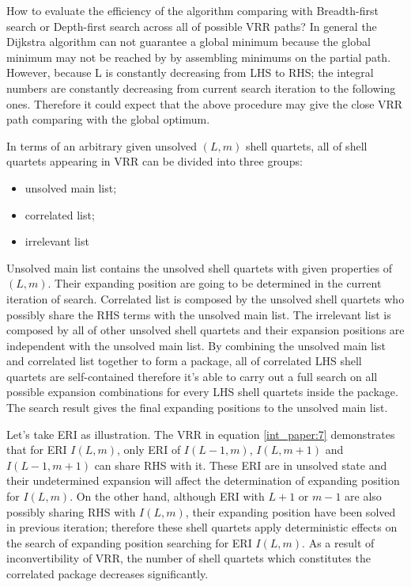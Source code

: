 How to evaluate the efficiency of the algorithm comparing with Breadth-first search
or Depth-first search across all of possible VRR paths? In general the Dijkstra algorithm
can not guarantee a global minimum because the global minimum may not be reached by
by assembling minimums on the partial path. However, because L is constantly decreasing
from LHS to RHS; the integral numbers are constantly decreasing from current search
iteration to the following ones. Therefore it could expect that the above procedure
may give the close VRR path comparing with the global optimum.

In terms of an arbitrary given unsolved $(L,m)$ shell quartets, all of shell quartets
appearing in VRR can be divided into three groups:
\begin{itemize}
 \item unsolved main list;
 \item correlated list;
 \item irrelevant list 
\end{itemize}
Unsolved main list contains the unsolved shell quartets with given properties of $(L,m)$.
Their expanding position are going to be determined in the current iteration of search. 
Correlated list is composed by the unsolved shell quartets who possibly share the RHS 
terms with the unsolved main list. The irrelevant list is composed by all of other 
unsolved shell quartets and their expansion positions are independent with the 
unsolved main list. By combining the unsolved main list and correlated list together 
to form a package, all of correlated LHS shell quartets are self-contained therefore 
it's able to carry out a full search on all possible expansion combinations for every 
LHS shell quartets inside the package. The search result gives the final expanding
positions to the unsolved main list.

Let's take ERI as illustration. The VRR in equation \ref{int_paper:7} demonstrates that 
for ERI $I(L,m)$, only ERI of $I(L-1,m)$, $I(L,m+1)$ and $I(L-1,m+1)$ can share RHS with it.
These ERI are in unsolved state and their undetermined expansion will affect the determination 
of expanding position for $I(L,m)$. On the other hand, although ERI with $L+1$ or $m-1$ are 
also possibly sharing RHS with $I(L,m)$, their expanding position have been solved in previous 
iteration; therefore these shell quartets apply deterministic effects on the search of expanding 
position searching for ERI $I(L,m)$. As a result of inconvertibility of VRR, the number of shell
quartets which constitutes the correlated package decreases significantly.

